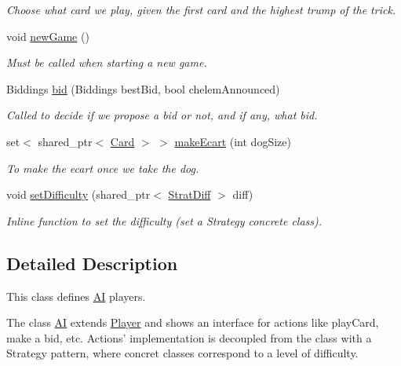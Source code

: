 \begin{DoxyCompactItemize}
\begin{DoxyCompactList}\small\item\em \-Choose what card we play, given the first card and the highest trump of the trick. \end{DoxyCompactList}\item 
void \hyperlink{classAI_a6cda26d3bf7238b1a7ea3725bf4aabb7}{new\-Game} ()
\begin{DoxyCompactList}\small\item\em \-Must be called when starting a new game. \end{DoxyCompactList}\item 
\-Biddings \hyperlink{classAI_a168d96ab354298c316faa905418cfb57}{bid} (\-Biddings best\-Bid, bool chelem\-Announced)
\begin{DoxyCompactList}\small\item\em \-Called to decide if we propose a bid or not, and if any, what bid. \end{DoxyCompactList}\item 
set$<$ shared\-\_\-ptr$<$ \hyperlink{classCard}{\-Card} $>$ $>$ \hyperlink{classAI_a7a7df533ccc838f818a1ee94c4153fe0}{make\-Ecart} (int dog\-Size)
\begin{DoxyCompactList}\small\item\em \-To make the ecart once we take the dog. \end{DoxyCompactList}\item 
void \hyperlink{classAI_a19cae044bb7f221819f61b017b6a7ffe}{set\-Difficulty} (shared\-\_\-ptr$<$ \hyperlink{classStratDiff}{\-Strat\-Diff} $>$ diff)
\begin{DoxyCompactList}\small\item\em \-Inline function to set the difficulty (set a \-Strategy concrete class). \end{DoxyCompactList}\end{DoxyCompactItemize}


\subsection{\-Detailed \-Description}
\-This class defines \hyperlink{classAI}{\-A\-I} players. 

\-The class \hyperlink{classAI}{\-A\-I} extends \hyperlink{classPlayer}{\-Player} and shows an interface for actions like play\-Card, make a bid, etc. \-Actions' implementation is decoupled from the class with a \-Strategy pattern, where concret classes correspond to a level of difficulty. 

